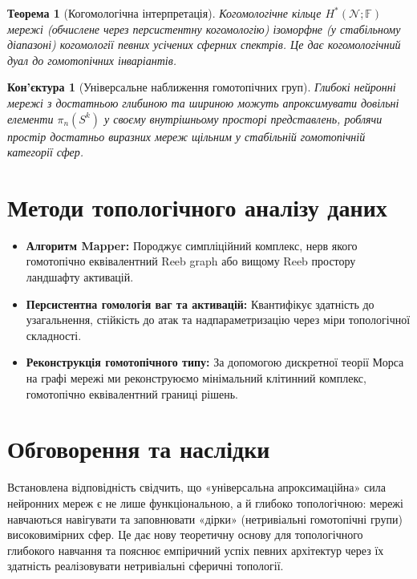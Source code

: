 \documentclass{article}
\newtheorem{theorem}{Теорема}
\newtheorem{conjecture}{Кон’єктура}
\begin{document}
\begin{theorem}[Когомологічна інтерпретація]
Когомологічне кільце $H^*(\mathcal{N}; \mathbb{F})$ мережі (обчислене через персистентну когомологію) ізоморфне (у стабільному діапазоні) когомології певних усічених сферних спектрів. Це дає когомологічний дуал до гомотопічних інваріантів.
\end{theorem}

\begin{conjecture}[Універсальне наближення гомотопічних груп]
Глибокі нейронні мережі з достатньою глибиною та шириною можуть апроксимувати довільні елементи $\pi_n(S^k)$ у своєму внутрішньому просторі представлень, роблячи простір достатньо виразних мереж щільним у стабільній гомотопічній категорії сфер.
\end{conjecture}

\section{Методи топологічного аналізу даних}

\begin{itemize}
    \item \textbf{Алгоритм Mapper:} Породжує симпліційний комплекс, нерв якого гомотопічно еквівалентний Reeb graph або вищому Reeb простору ландшафту активацій.
    \item \textbf{Персистентна гомологія ваг та активацій:} Квантифікує здатність до узагальнення, стійкість до атак та надпараметризацію через міри топологічної складності.
    \item \textbf{Реконструкція гомотопічного типу:} За допомогою дискретної теорії Морса на графі мережі ми реконструюємо мінімальний клітинний комплекс, гомотопічно еквівалентний границі рішень.
\end{itemize}

\section{Обговорення та наслідки}

Встановлена відповідність свідчить, що «універсальна апроксимаційна» сила нейронних мереж є не лише функціональною, а й глибоко топологічною: мережі навчаються навігувати та заповнювати «дірки» (нетривіальні гомотопічні групи) високовимірних сфер. Це дає нову теоретичну основу для топологічного глибокого навчання та пояснює емпіричний успіх певних архітектур через їх здатність реалізовувати нетривіальні сферичні топології.
\end{document}
